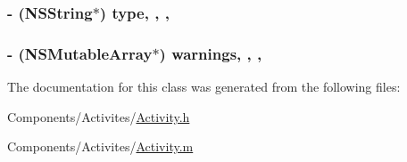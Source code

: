 \hypertarget{interface_activity_a8619c7b5d0a0a2cfdad6a94c6ea45595}{
\subsubsection[{type}]{\setlength{\rightskip}{0pt plus 5cm}-\/ (N\-S\-String$\ast$) type\hspace{0.3cm}{\ttfamily [read]}, {\ttfamily [write]}, {\ttfamily [nonatomic]}, {\ttfamily [strong]}}}\label{interface_activity_a8619c7b5d0a0a2cfdad6a94c6ea45595}
\hypertarget{interface_activity_a59cf6d1a6bc8d97f373e5b05f852ce31}{
\subsubsection[{warnings}]{\setlength{\rightskip}{0pt plus 5cm}-\/ (N\-S\-Mutable\-Array$\ast$) warnings\hspace{0.3cm}{\ttfamily [read]}, {\ttfamily [write]}, {\ttfamily [nonatomic]}, {\ttfamily [strong]}}}\label{interface_activity_a59cf6d1a6bc8d97f373e5b05f852ce31}


The documentation for this class was generated from the following files\-:\begin{DoxyCompactItemize}
\item 
Components/\-Activites/\hyperlink{_activity_8h}{Activity.\-h}\item 
Components/\-Activites/\hyperlink{_activity_8m}{Activity.\-m}\end{DoxyCompactItemize}
